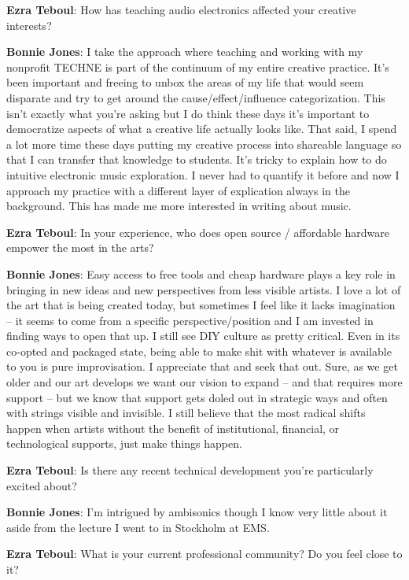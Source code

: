 \textbf{Ezra Teboul}: How has teaching audio electronics affected your creative interests?

\textbf{Bonnie Jones}: I take the approach where teaching and working with my nonprofit TECHNE is part of the continuum of my entire creative practice. It’s been important and freeing to unbox the areas of my life that would seem disparate and try to get around the cause/effect/influence categorization. This isn’t exactly what you’re asking but I do think these days it’s important to democratize aspects of what a creative life actually looks like. That said, I spend a lot more time these days putting my creative process into shareable language so that I can transfer that knowledge to students. It’s tricky to explain how to do intuitive electronic music exploration. I never had to quantify it before and now I approach my practice with a different layer of explication always in the background. This has made me more interested in writing about music. 

\textbf{Ezra Teboul}: In your experience, who does open source / affordable hardware empower the most in the arts?

\textbf{Bonnie Jones}: Easy access to free tools and cheap hardware plays a key role in bringing in new ideas and new perspectives from less visible artists. I love a lot of the art that is being created today, but sometimes I feel like it lacks imagination – it seems to come from a specific perspective/position and I am invested in finding ways to open that up.  
I still see DIY culture as pretty critical. Even in its co-opted and packaged state, being able to make shit with whatever is available to you is pure improvisation. I appreciate that and seek that out. Sure, as we get older and our art develops we want our vision to expand – and that requires more support – but we know that support gets doled out in strategic ways and often with strings visible and invisible. I still believe that the most radical shifts happen when artists without the benefit of institutional, financial, or technological supports, just make things happen.  

\textbf{Ezra Teboul}: Is there any recent technical development you're particularly excited about? 

\textbf{Bonnie Jones}: I’m intrigued by ambisonics though I know very little about it aside from the lecture I went to in Stockholm at EMS. 

\textbf{Ezra Teboul}: What is your current professional community? Do you feel close to it?

